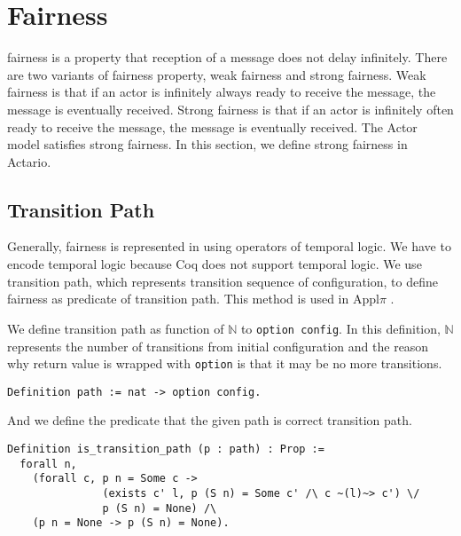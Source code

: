 \section{Fairness}

\textsf{fairness} is a property that reception of a message does not delay infinitely.
There are two variants of fairness property, weak fairness and strong fairness.
Weak fairness is that if an actor is infinitely always ready to receive the message, the message is eventually received.
Strong fairness is that if an actor is infinitely often ready to receive the message, the message is eventually received.
The Actor model satisfies strong fairness.
In this section, we define strong fairness in Actario.

\subsection{Transition Path}
Generally, fairness is represented in using operators of temporal logic.
We have to encode temporal logic because Coq does not support temporal logic.
We use transition path, which represents transition sequence of configuration, to define fairness as predicate of transition path.
This method is used in Appl$\pi$ \cite{Affeldt200817}.

We define transition path as function of $\mathbb{N}$ to \texttt{option config}.
In this definition, $\mathbb{N}$ represents the number of transitions from initial configuration and the reason why return value is wrapped with \texttt{option} is that it may be no more transitions.

\begin{lstlisting}
Definition path := nat -> option config.
\end{lstlisting}

And we define the predicate that the given path is correct transition path.

\begin{lstlisting}
Definition is_transition_path (p : path) : Prop :=
  forall n,
    (forall c, p n = Some c ->
               (exists c' l, p (S n) = Some c' /\ c ~(l)~> c') \/
               p (S n) = None) /\
    (p n = None -> p (S n) = None).
\end{lstlisting}

